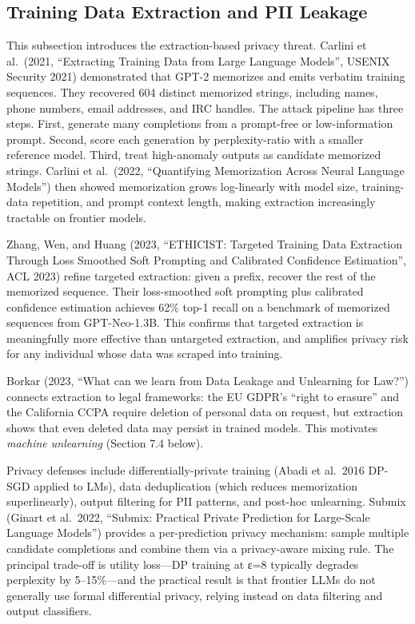 \documentclass{article}
\begin{document}
\subsection{Training Data Extraction and PII Leakage}\label{training-data-extraction-and-pii-leakage}

This subsection introduces the extraction-based privacy threat. Carlini et al.~(2021, ``Extracting Training Data from Large Language Models'', USENIX Security 2021) demonstrated that GPT-2 memorizes and emits verbatim training sequences. They recovered 604 distinct memorized strings, including names, phone numbers, email addresses, and IRC handles. The attack pipeline has three steps. First, generate many completions from a prompt-free or low-information prompt. Second, score each generation by perplexity-ratio with a smaller reference model. Third, treat high-anomaly outputs as candidate memorized strings. Carlini et al.~(2022, ``Quantifying Memorization Across Neural Language Models'') then showed memorization grows log-linearly with model size, training-data repetition, and prompt context length, making extraction increasingly tractable on frontier models.

Zhang, Wen, and Huang (2023, ``ETHICIST: Targeted Training Data Extraction Through Loss Smoothed Soft Prompting and Calibrated Confidence Estimation'', ACL 2023) refine targeted extraction: given a prefix, recover the rest of the memorized sequence. Their loss-smoothed soft prompting plus calibrated confidence estimation achieves 62\% top-1 recall on a benchmark of memorized sequences from GPT-Neo-1.3B. This confirms that targeted extraction is meaningfully more effective than untargeted extraction, and amplifies privacy risk for any individual whose data was scraped into training.

Borkar (2023, ``What can we learn from Data Leakage and Unlearning for Law?'') connects extraction to legal frameworks: the EU GDPR's ``right to erasure'' and the California CCPA require deletion of personal data on request, but extraction shows that even deleted data may persist in trained models. This motivates \emph{machine unlearning} (Section 7.4 below).

Privacy defenses include differentially-private training (Abadi et al.~2016 DP-SGD applied to LMs), data deduplication (which reduces memorization superlinearly), output filtering for PII patterns, and post-hoc unlearning. Submix (Ginart et al.~2022, ``Submix: Practical Private Prediction for Large-Scale Language Models'') provides a per-prediction privacy mechanism: sample multiple candidate completions and combine them via a privacy-aware mixing rule. The principal trade-off is utility loss---DP training at ε=8 typically degrades perplexity by 5--15\%---and the practical result is that frontier LLMs do not generally use formal differential privacy, relying instead on data filtering and output classifiers.
\end{document}
